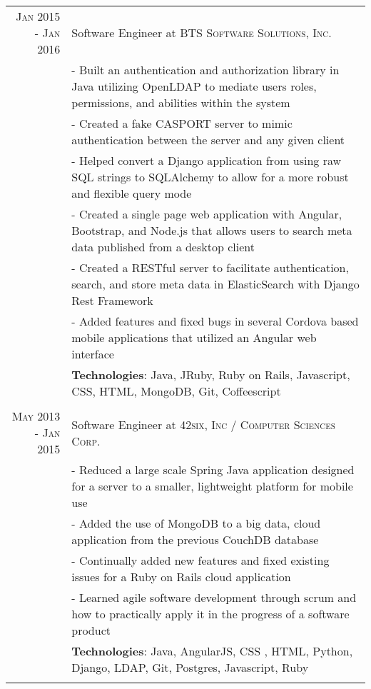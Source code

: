 \documentclass[a4paper,11pt]{article} %
\begin{document}
\begin{tabular}{r|p{11cm}}
\textsc{Jan 2015 - Jan 2016} & Software Engineer at \textsc{BTS Software Solutions, Inc.}\\
& \footnotesize{- Built an authentication and authorization library in Java utilizing OpenLDAP to mediate users roles, permissions, and abilities within the system}\\
& \footnotesize{- Created a fake CASPORT server to mimic authentication between the server and any given client}\\
& \footnotesize{- Helped convert a Django application from using raw SQL strings to SQLAlchemy to allow for a more robust and flexible query mode}\\
& \footnotesize{- Created a single page web application with Angular, Bootstrap, and Node.js that allows users to search meta data published from a desktop client}\\
& \footnotesize{- Created a RESTful server to facilitate authentication, search, and store meta data in ElasticSearch with Django Rest Framework}\\
& \footnotesize{- Added features and fixed bugs in several Cordova based mobile applications that utilized an Angular web interface}\\
& \footnotesize{\textbf{Technologies}: Java, JRuby, Ruby on Rails, Javascript, CSS, HTML, MongoDB, Git, Coffeescript }\\
\multicolumn{2}{c}{} \\


\textsc{May 2013 - Jan 2015} & Software Engineer at \textsc{42six, Inc / Computer Sciences Corp.}\\
& \footnotesize{- Reduced a large scale Spring Java application designed for a server to a smaller, lightweight platform for mobile use}\\
& \footnotesize{- Added the use of MongoDB to a big data, cloud application from the previous CouchDB database}\\
& \footnotesize{- Continually added new features and fixed existing issues for a Ruby on Rails cloud application}\\
& \footnotesize{- Learned agile software development through scrum and how to practically apply it in the progress of a software product}\\
& \footnotesize{\textbf{Technologies}: Java, AngularJS, CSS , HTML, Python, Django, LDAP, Git, Postgres, Javascript, Ruby}\\
\multicolumn{2}{c}{} \\

\end{tabular}
\end{document}
